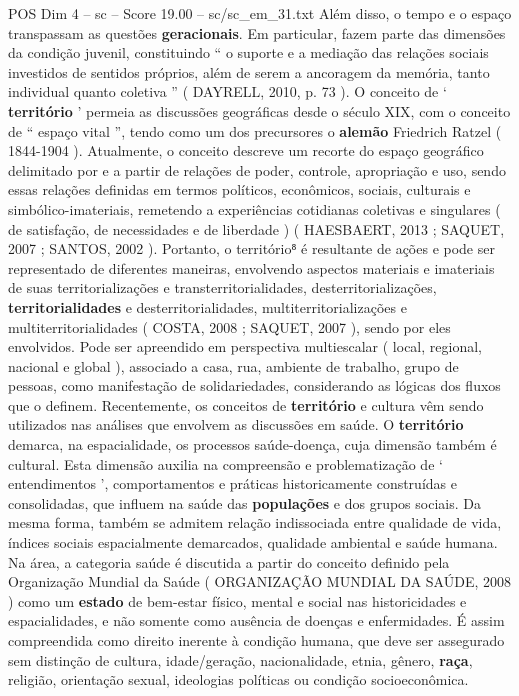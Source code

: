 \begin{textsample}{POS Dim 4 – sc – Score 19.00 – sc/sc\_em\_31.txt}
Além disso, o tempo e o espaço transpassam as questões \textbf{geracionais}.
Em particular, fazem parte das dimensões da condição juvenil, constituindo “ o suporte e a mediação das relações sociais investidos de sentidos próprios, além de serem a ancoragem da memória, tanto individual quanto coletiva ” ( DAYRELL, 2010, p. 73 ).
O conceito de ‘ \textbf{território} ’ permeia as discussões geográficas desde o século XIX, com o conceito de “ espaço vital ”, tendo como um dos precursores o \textbf{alemão} Friedrich Ratzel ( 1844-1904 ).
Atualmente, o conceito descreve um recorte do espaço geográfico delimitado por e a partir de relações de poder, controle, apropriação e uso, sendo essas relações definidas em termos políticos, econômicos, sociais, culturais e simbólico-imateriais, remetendo a experiências cotidianas coletivas e singulares ( de satisfação, de necessidades e de liberdade ) ( HAESBAERT, 2013 ; SAQUET, 2007 ; SANTOS, 2002 ).
Portanto, o território⁸ é resultante de ações e pode ser representado de diferentes maneiras, envolvendo aspectos materiais e imateriais de suas territorializações e transterritorialidades, desterritorializações, \textbf{territorialidades} e desterritorialidades, multiterritorializações e multiterritorialidades ( COSTA, 2008 ; SAQUET, 2007 ), sendo por eles envolvidos.
Pode ser apreendido em perspectiva multiescalar ( local, regional, nacional e global ), associado a casa, rua, ambiente de trabalho, grupo de pessoas, como manifestação de solidariedades, considerando as lógicas dos fluxos que o definem.
Recentemente, os conceitos de \textbf{território} e cultura vêm sendo utilizados nas análises que envolvem as discussões em saúde.
O \textbf{território} demarca, na espacialidade, os processos saúde-doença, cuja dimensão também é cultural.
Esta dimensão auxilia na compreensão e problematização de ‘ entendimentos ’, comportamentos e práticas historicamente construídas e consolidadas, que influem na saúde das \textbf{populações} e dos grupos sociais.
Da mesma forma, também se admitem relação indissociada entre qualidade de vida, índices sociais espacialmente demarcados, qualidade ambiental e saúde humana.
Na área, a categoria saúde é discutida a partir do conceito definido pela Organização Mundial da Saúde ( ORGANIZAÇÃO MUNDIAL DA SAÚDE, 2008 ) como um \textbf{estado} de bem-estar físico, mental e social nas historicidades e espacialidades, e não somente como ausência de doenças e enfermidades.
É assim compreendida como direito inerente à condição humana, que deve ser assegurado sem distinção de cultura, idade/geração, nacionalidade, etnia, gênero, \textbf{raça}, religião, orientação sexual, ideologias políticas ou condição socioeconômica.

\end{textsample}

